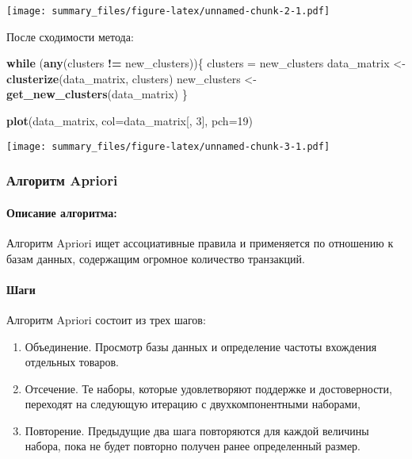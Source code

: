 \documentclass[
]{article}
\newenvironment{Shaded}{\begin{snugshade}}{\end{snugshade}}
\newcommand{\ControlFlowTok}[1]{\textcolor[rgb]{0.13,0.29,0.53}{\textbf{#1}}}
\newcommand{\DataTypeTok}[1]{\textcolor[rgb]{0.13,0.29,0.53}{#1}}
\newcommand{\DecValTok}[1]{\textcolor[rgb]{0.00,0.00,0.81}{#1}}
\newcommand{\KeywordTok}[1]{\textcolor[rgb]{0.13,0.29,0.53}{\textbf{#1}}}
\newcommand{\NormalTok}[1]{#1}
\newcommand{\OperatorTok}[1]{\textcolor[rgb]{0.81,0.36,0.00}{\textbf{#1}}}
\newcommand{\StringTok}[1]{\textcolor[rgb]{0.31,0.60,0.02}{#1}}
\providecommand{\tightlist}{%
  \setlength{\itemsep}{0pt}\setlength{\parskip}{0pt}}
\begin{document}
\texttt{[image: summary\_files/figure-latex/unnamed-chunk-2-1.pdf]}

После сходимости метода:

\begin{Shaded}
\begin{Highlighting}[]
\ControlFlowTok{while}\NormalTok{ (}\KeywordTok{any}\NormalTok{(clusters }\OperatorTok{!=}\StringTok{ }\NormalTok{new_clusters))\{}
\NormalTok{  clusters =}\StringTok{ }\NormalTok{new_clusters}
\NormalTok{  data_matrix <-}\StringTok{ }\KeywordTok{clusterize}\NormalTok{(data_matrix, clusters)}
\NormalTok{  new_clusters <-}\StringTok{ }\KeywordTok{get_new_clusters}\NormalTok{(data_matrix)}
\NormalTok{\}}

\KeywordTok{plot}\NormalTok{(data_matrix, }\DataTypeTok{col=}\NormalTok{data_matrix[, }\DecValTok{3}\NormalTok{], }\DataTypeTok{pch=}\DecValTok{19}\NormalTok{)}
\end{Highlighting}
\end{Shaded}

\texttt{[image: summary\_files/figure-latex/unnamed-chunk-3-1.pdf]}

\hypertarget{ux430ux43bux433ux43eux440ux438ux442ux43c-apriori}{%
\subsubsection{Алгоритм
Apriori}\label{ux430ux43bux433ux43eux440ux438ux442ux43c-apriori}}

\hypertarget{ux43eux43fux438ux441ux430ux43dux438ux435-ux430ux43bux433ux43eux440ux438ux442ux43cux430-1}{%
\paragraph{Описание
алгоритма:}\label{ux43eux43fux438ux441ux430ux43dux438ux435-ux430ux43bux433ux43eux440ux438ux442ux43cux430-1}}

Алгоритм Apriori ищет ассоциативные правила и применяется по отношению к
базам данных, содержащим огромное количество транзакций.

\hypertarget{ux448ux430ux433ux438}{%
\paragraph{Шаги}\label{ux448ux430ux433ux438}}

Алгоритм Apriori состоит из трех шагов:

\begin{enumerate}
\def\labelenumi{\arabic{enumi}.}
\tightlist
\item
  Объединение. Просмотр базы данных и определение частоты вхождения
  отдельных товаров.
\item
  Отсечение. Те наборы, которые удовлетворяют поддержке и достоверности,
  переходят на следующую итерацию с двухкомпонентными наборами,
\item
  Повторение. Предыдущие два шага повторяются для каждой величины
  набора, пока не будет повторно получен ранее определенный размер.
\end{enumerate}
\end{document}
